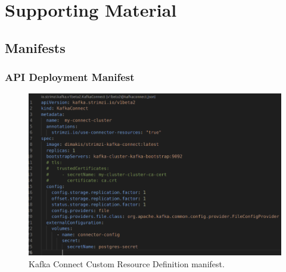 \chapter{Supporting Material}
\label{supportingMaterial}

	\section{Manifests}

	\subsection{API Deployment Manifest}
    \begin{figure} [ht]
        \begin{center}
            \includegraphics[width=1\textwidth]{figures/kafka-connect-manifest.png}
            \caption{Kafka Connect Custom Resource Definition manifest.}
            \label{fig: A.1}
        \end{center}
    \end{figure}
    \pagebreak
